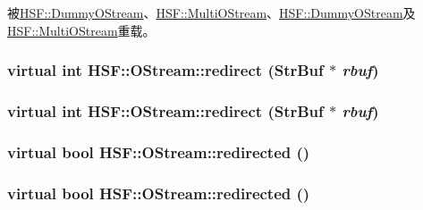 被\hyperlink{classHSF_1_1DummyOStream_a2388508ce3a9278f7d0aa4ccfd56f432}{HSF::DummyOStream}、\hyperlink{classHSF_1_1MultiOStream_a5539fcb94f7ab127f5d41768f18c59d0}{HSF::MultiOStream}、\hyperlink{classHSF_1_1DummyOStream_a2388508ce3a9278f7d0aa4ccfd56f432}{HSF::DummyOStream}及\hyperlink{classHSF_1_1MultiOStream_a5539fcb94f7ab127f5d41768f18c59d0}{HSF::MultiOStream}重载。\hypertarget{classHSF_1_1OStream_aedd010fc73297368032ada516d0577d8}{
\subsubsection[{redirect}]{\setlength{\rightskip}{0pt plus 5cm}virtual int HSF::OStream::redirect ({\bf StrBuf} $\ast$ {\em rbuf})}}
\label{classHSF_1_1OStream_aedd010fc73297368032ada516d0577d8}
\hypertarget{classHSF_1_1OStream_aedd010fc73297368032ada516d0577d8}{
\subsubsection[{redirect}]{\setlength{\rightskip}{0pt plus 5cm}virtual int HSF::OStream::redirect ({\bf StrBuf} $\ast$ {\em rbuf})}}
\label{classHSF_1_1OStream_aedd010fc73297368032ada516d0577d8}
\hypertarget{classHSF_1_1OStream_ab478550e6310a030950dd8d8f354562b}{
\subsubsection[{redirected}]{\setlength{\rightskip}{0pt plus 5cm}virtual bool HSF::OStream::redirected ()}}
\label{classHSF_1_1OStream_ab478550e6310a030950dd8d8f354562b}
\hypertarget{classHSF_1_1OStream_ab478550e6310a030950dd8d8f354562b}{
\subsubsection[{redirected}]{\setlength{\rightskip}{0pt plus 5cm}virtual bool HSF::OStream::redirected ()}}
